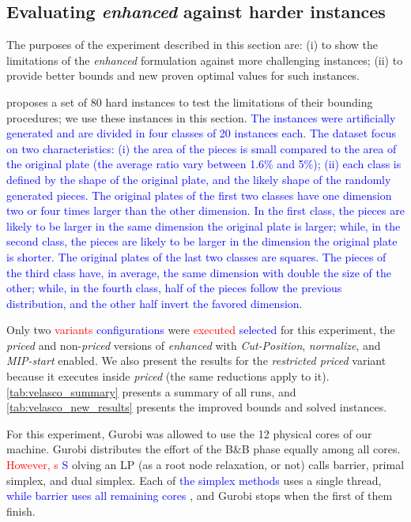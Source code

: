 \documentclass[smallextended]{svjour3}       %
\newif\iffinalversion
\newcommand{\newtext}[1]{\iffinalversion%
#1%
\else%
\textcolor{blue}{#1}%
\fi%
}
\newcommand{\oldtext}[1]{\iffinalversion%
\else%
\textcolor{red}{#1}%
\fi%
}
\begin{document}
\subsection{Evaluating \emph{enhanced} against harder instances}
\label{sec:new_results}

The purposes of the experiment described in this section are:
(i) to show the limitations of the \emph{enhanced} formulation against more challenging instances;
(ii) to provide better bounds and new proven optimal values for such instances.

\cite{velasco:2019} proposes a set of 80 hard instances to test the limitations of their bounding procedures; we use these instances in this section. \newtext{The instances were artificially generated and are divided in four classes of 20 instances each. The dataset focus on two characteristics: (i) the area of the pieces is small compared to the area of the original plate (the average ratio vary between 1.6\% and 5\%); (ii) each class is defined by the shape of the original plate, and the likely shape of the randomly generated pieces. The original plates of the first two classes have one dimension two or four times larger than the other dimension. In the first class, the pieces are likely to be larger in the same dimension the original plate is larger; while, in the second class, the pieces are likely to be larger in the dimension the original plate is shorter. The original plates of the last two classes are squares. The pieces of the third class have, in average, the same dimension with double the size of the other; while, in the fourth class, half of the pieces follow the previous distribution, and the other half invert the favored dimension.}

Only two \oldtext{variants}\newtext{configurations} were \oldtext{executed}\newtext{selected} for this experiment, the \emph{priced} and non-\emph{priced} versions of \emph{enhanced} with \emph{Cut-Position}, \emph{normalize}, and \emph{MIP-start} enabled.
We also present the results for the \emph{restricted priced} variant because it executes inside \emph{priced} (the same reductions apply to it).
\autoref{tab:velasco_summary} presents a summary of all runs, and \autoref{tab:velasco_new_results} presents the improved bounds and solved instances.

For this experiment, Gurobi was allowed to use the 12 physical cores of our machine.
Gurobi distributes the effort of the B\&B phase equally among all cores.
\oldtext{However, s}\newtext{S}olving an LP (as a root node relaxation, or not) calls barrier, primal simplex, and dual simplex.
Each of \newtext{the simplex methods} uses a single thread, \newtext{while barrier uses all remaining cores}, and Gurobi stops when the first of them finish.
\end{document}
